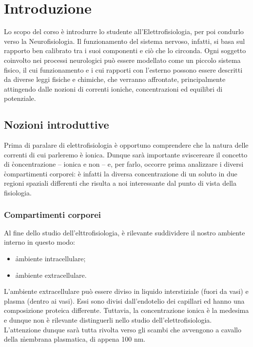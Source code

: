 \chapter{Introduzione}
Lo scopo del corso è introdurre lo studente all'Elettrofisiologia, per poi condurlo verso la Neurofisiologia. Il funzionamento del sistema nervoso, infatti, si basa sul rapporto ben calibrato tra i suoi componenti e ciò che lo circonda. Ogni soggetto coinvolto nei processi neurologici può essere modellato come un piccolo sistema fisico, il cui funzionamento e i cui rapporti con l'esterno possono essere descritti da diverse leggi fisiche e chimiche, che verranno affrontate, principalmente attingendo dalle nozioni di correnti ioniche, concentrazioni ed equilibri di potenziale.

\section{Nozioni introduttive}
Prima di paralare di elettrofisiologia è opportuno comprendere che la natura delle correnti di cui parleremo è \h{ionica}. Dunque sarà importante sviscereare il concetto di \h{concentrazione} -- ionica e non -- e, per farlo, occorre prima analizzare i diversi \h{compartimenti corporei}: è infatti la diversa concentrazione di un soluto in due regioni spaziali differenti che risulta a noi interessante dal punto di vista della fisiologia.

\subsection{Compartimenti corporei}
Al fine dello studio dell'elttrofisiologia, è rilevante {suddividere} il nostro ambiente interno in questo modo:
\begin{itemize}
    \item \h{ambiente intracellulare};
    \item \h{ambiente extracellulare}.
\end{itemize}
L'ambiente extracellulare può essere diviso in liquido interstiziale (fuori da vasi) e plasma (dentro ai vasi). Essi sono divisi dall'endotelio dei capillari ed hanno una composizione proteica differente. Tuttavia, la concentrazione ionica è la medesima e dunque non è rilevante distinguerli nello studio dell'elettrofisiologia. L'attenzione dunque sarà tutta rivolta verso gli scambi che avvengono a cavallo della \h{membrana plasmatica}, di appena 100 nm.


